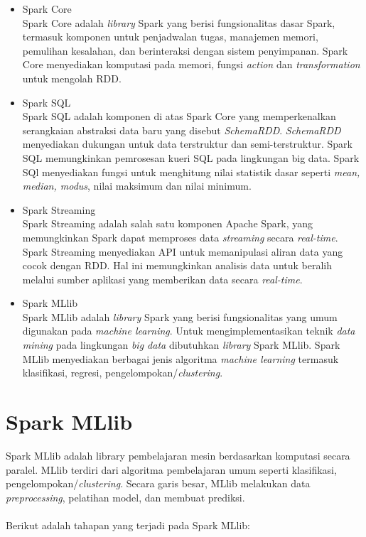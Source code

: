 \begin{itemize}
\item Spark Core \\
Spark Core adalah \textit{library} Spark yang berisi fungsionalitas dasar Spark, termasuk komponen untuk penjadwalan tugas, manajemen memori, pemulihan kesalahan, dan berinteraksi dengan sistem penyimpanan. Spark Core menyediakan komputasi pada memori, fungsi \textit{action} dan \textit{transformation} untuk mengolah RDD.

\item Spark SQL  \\
Spark SQL adalah komponen di atas Spark Core yang memperkenalkan serangkaian abstraksi data baru yang disebut \textit{SchemaRDD}. \textit{SchemaRDD} menyediakan dukungan untuk data terstruktur dan semi-terstruktur. Spark SQL memungkinkan pemrosesan kueri SQL pada lingkungan big data. Spark SQl menyediakan fungsi untuk menghitung nilai statistik dasar seperti \textit{mean, median, modus}, nilai maksimum dan nilai minimum.

\item Spark Streaming \\
Spark Streaming adalah salah satu komponen Apache Spark, yang memungkinkan Spark dapat memproses data \textit{streaming} secara \textit{real-time}. Spark Streaming menyediakan API untuk memanipulasi aliran data yang cocok dengan RDD. Hal ini memungkinkan analisis data untuk beralih melalui sumber aplikasi yang memberikan data secara \textit{real-time}. 

\item
Spark MLlib \\
Spark MLlib adalah \textit{library} Spark yang berisi fungsionalitas yang umum digunakan pada \textit{machine learning}. Untuk mengimplementasikan teknik \textit{data mining} pada lingkungan \textit{big data} dibutuhkan \textit{library} Spark MLlib. Spark MLlib menyediakan berbagai jenis algoritma \textit{machine learning} termasuk klasifikasi, regresi, pengelompokan/\textit{clustering}.
\end{itemize}

\section{Spark MLlib}
\label{sec:konsep_spark_mllib}
Spark MLlib adalah library pembelajaran mesin berdasarkan komputasi secara paralel. MLlib terdiri dari algoritma pembelajaran umum seperti klasifikasi, pengelompokan/\textit{clustering}. Secara garis besar, MLlib melakukan data \textit{preprocessing}, pelatihan model, dan membuat prediksi.
\\\\
Berikut adalah tahapan yang terjadi pada Spark MLlib:

